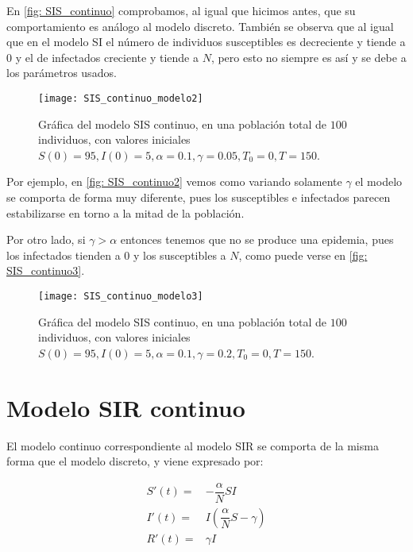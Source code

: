 En \eqref{fig: SIS_continuo} comprobamos, al igual que hicimos antes, que su comportamiento es análogo al modelo discreto. También se observa que al igual que en el modelo SI el número de individuos susceptibles es decreciente y tiende a $0$ y el de infectados creciente y tiende a $N$, pero esto no siempre es así y se debe a los parámetros usados.

\begin{figure}
\begin{center}
\caption{Gráfica del modelo SIS continuo, en una población total de $100$ individuos, con valores iniciales $S(0)=95, I(0) = 5, \alpha = 0.1, \gamma = 0.05, T_0 = 0, T = 150$.}
\label{fig: SIS_continuo2}
\texttt{[image: SIS\_continuo\_modelo2]}
\end{center}
\end{figure}


Por ejemplo, en \eqref{fig: SIS_continuo2} vemos como variando solamente $\gamma$ el modelo se comporta de forma muy diferente, pues los susceptibles e infectados parecen estabilizarse en torno a la mitad de la población.

Por otro lado, si $\gamma > \alpha$ entonces tenemos que no se produce una epidemia, pues los infectados tienden a $0$ y los susceptibles a $N$, como puede verse en \eqref{fig: SIS_continuo3}.

\begin{figure}
\begin{center}
\caption{Gráfica del modelo SIS continuo, en una población total de $100$ individuos, con valores iniciales $S(0)=95, I(0) = 5, \alpha = 0.1, \gamma = 0.2, T_0 = 0, T = 150$.}
\label{fig: SIS_continuo3}
\texttt{[image: SIS\_continuo\_modelo3]}
\end{center}
\end{figure}


\section{Modelo SIR continuo}


El modelo continuo correspondiente al modelo SIR se comporta de la misma forma que el modelo discreto, y viene expresado por:

\begin{equation}
\label{eqn: modelo_SIR_continuo}
\begin{aligned}
S'(t) = & -\dfrac{\alpha}{N}SI \\
I'(t) = & I\left(\dfrac{\alpha}{N}S-\gamma \right) \\
R'(t) = & \gamma I
\end{aligned}
\end{equation}

